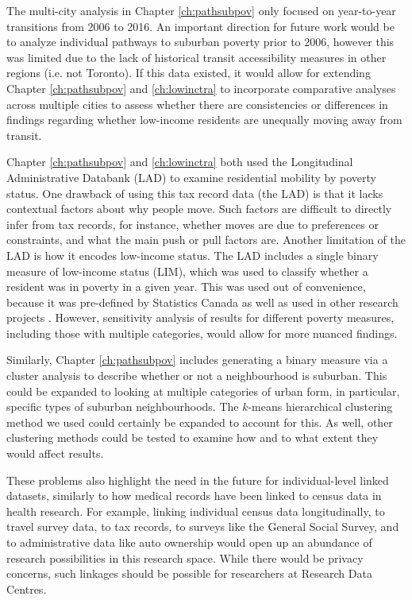The multi-city analysis in Chapter \ref{ch:pathsubpov} only focused on year-to-year transitions from 2006 to 2016. An important direction for future work would be to analyze individual pathways to suburban poverty prior to 2006, however this was limited due to the lack of historical transit accessibility measures in other regions (i.e. not Toronto). If this data existed, it would allow for extending Chapter \ref{ch:pathsubpov} and \ref{ch:lowinctra} to incorporate comparative analyses across multiple cities to assess whether there are consistencies or differences in findings regarding whether low-income residents are unequally moving away from transit.

Chapter \ref{ch:pathsubpov} and \ref{ch:lowinctra} both used the Longitudinal Administrative Databank (LAD) to examine residential mobility by poverty status. One drawback of using this tax record data (the LAD) is that it lacks contextual factors about why people move. Such factors are difficult to directly infer from tax records, for instance, whether moves are due to preferences or constraints, and what the main push or pull factors are. Another limitation of the LAD is how it encodes low-income status. The LAD includes a single binary measure of low-income status (LIM), which was used to classify whether a resident was in poverty in a given year. This was used out of convenience, because it was pre-defined by Statistics Canada as well as used in other research projects \cite{picot_immigration_2014,allen_sizing_2019,brown_money_2019}. However, sensitivity analysis of results for different poverty measures, including those with multiple categories, would allow for more nuanced findings. 

Similarly, Chapter \ref{ch:pathsubpov} includes generating a binary measure via a cluster analysis to describe whether or not a neighbourhood is suburban. This could be expanded to looking at multiple categories of urban form, in particular, specific types of suburban neighbourhoods. The $k$-means hierarchical clustering method we used could certainly be expanded to account for this. As well, other clustering methods could be tested to examine how and to what extent they would affect results.

These problems also highlight the need in the future for individual-level linked datasets, similarly to how medical records have been linked to census data in health research. For example, linking individual census data longitudinally, to travel survey data, to tax records, to surveys like the General Social Survey, and to administrative data like auto ownership would open up an abundance of research possibilities in this research space. While there would be privacy concerns, such linkages should be possible for researchers at Research Data Centres.



